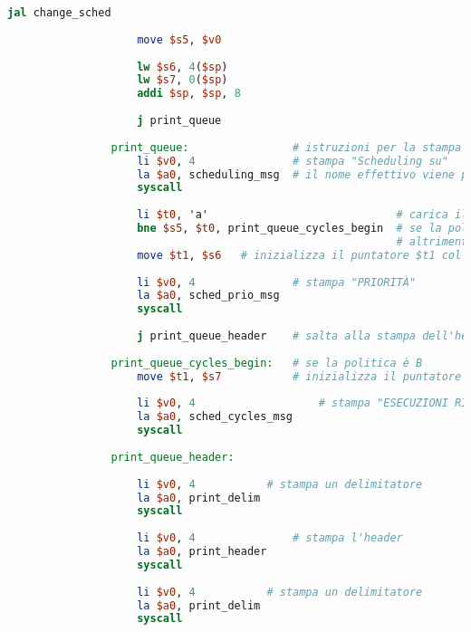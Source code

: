 \begin{center}
\begin{lstlisting}[language=mips, gobble=14, stepnumber=1]
                    jal change_sched
                    
                    move $s5, $v0
                    
                    lw $s6, 4($sp)
                    lw $s7, 0($sp)
                    addi $sp, $sp, 8
                    
                    j print_queue
                    
                print_queue:                # istruzioni per la stampa della coda
                    li $v0, 4               # stampa "Scheduling su"
                    la $a0, scheduling_msg  # il nome effettivo viene poi stampato a seconda dello scheduling attuale
                    syscall
                
                    li $t0, 'a'                             # carica il carattere 'a', per poterlo comparare con la politica attuale
                    bne $s5, $t0, print_queue_cycles_begin  # se la politica non è A, esegui l'inizializzazione per la politica B
                                                            # altrimenti
                    move $t1, $s6   # inizializza il puntatore $t1 col puntatore di A
                    
                    li $v0, 4               # stampa "PRIORITÀ"
                    la $a0, sched_prio_msg
                    syscall
                    
                    j print_queue_header    # salta alla stampa dell'header della tabella
                    
                print_queue_cycles_begin:   # se la politica è B
                    move $t1, $s7           # inizializza il puntatore $t1 col puntatore di B
                
                    li $v0, 4                   # stampa "ESECUZIONI RIMANENTI"
                    la $a0, sched_cycles_msg
                    syscall
                    
                print_queue_header:
                    
                    li $v0, 4           # stampa un delimitatore
                    la $a0, print_delim
                    syscall
                    
                    li $v0, 4               # stampa l'header
                    la $a0, print_header
                    syscall
                    
                    li $v0, 4           # stampa un delimitatore
                    la $a0, print_delim
                    syscall
                    

\end{lstlisting}
\end{center}
